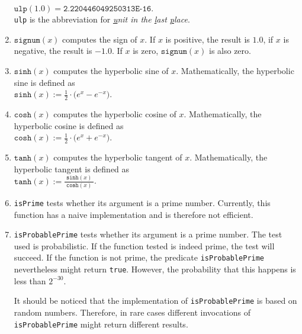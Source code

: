 \begin{enumerate}
      \\[0.2cm]
      \hspace*{1.3cm}
      $\mathtt{ulp}(1.0) = \texttt{2.220446049250313E-16}$.
      \\[0.2cm]
      \texttt{ulp} is the abbreviation for 
      \emph{\underline{u}nit in the \underline{l}ast \underline{p}lace}. 
\item $\mathtt{signum}(x)$ computes the sign of $x$.  If $x$ is positive, the result is
      $1.0$, if $x$ is negative, the result is $-1.0$.  If $x$ is zero,
      $\mathtt{signum}(x)$ is also zero.
\item $\texttt{sinh}(x)$ computes the hyperbolic sine of $x$.  Mathematically, the
      hyperbolic sine is defined as 
      \\[0.2cm]
      \hspace*{1.3cm}
      $\mathtt{sinh}(x) := \frac{1}{2} \cdot \bigl(e^x - e^{-x}\bigr)$.
\item $\texttt{cosh}(x)$ computes the hyperbolic cosine of $x$.  Mathematically, the
      hyperbolic cosine is defined as 
      \\[0.2cm]
      \hspace*{1.3cm}
      $\mathtt{cosh}(x) := \frac{1}{2} \cdot \bigl(e^x + e^{-x}\bigr)$.
\item $\texttt{tanh}(x)$ computes the hyperbolic tangent of $x$.  Mathematically, the
      hyperbolic tangent is defined as 
      \\[0.2cm]
      \hspace*{1.3cm}
      $\mathtt{tanh}(x) := \displaystyle \frac{\;\mathtt{sinh}(x)\;}{\mathtt{cosh}(x)}$.
\item \texttt{isPrime} tests whether its argument is a prime number.  Currently, 
      this function has a naive implementation and is therefore not efficient.
\item \texttt{isProbablePrime} tests whether its argument is a prime number.  The test
      used is probabilistic.  If the function tested is indeed  prime, the test 
      will succeed.  If the function is not prime, the predicate \texttt{isProbablePrime}
      nevertheless might return \texttt{true}.  However, the probability that this happens
      is less than $2^{-30}$.

      It should be noticed that the implementation of \texttt{isProbablePrime} is
      based on random numbers.  Therefore, in rare cases different invocations of
      \texttt{isProbablePrime} might return different results.  
\end{enumerate}


